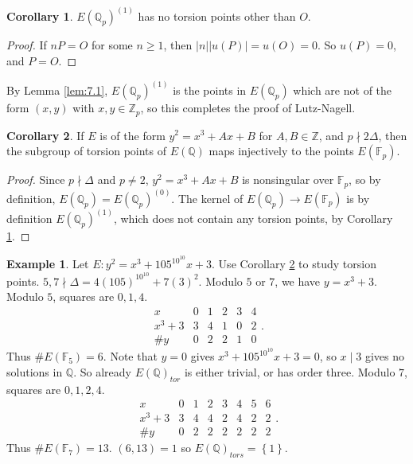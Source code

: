 \documentclass{article}
\newcommand{\F}{\mathbb{F}}
\newcommand{\Z}{\mathbb{Z}}
\newcommand{\Q}{\mathbb{Q}}
\newcommand{\rb}[1]{\left( #1 \right)}
\newcommand{\cb}[1]{\left\{ #1 \right\}}
\newcommand{\abs}[1]{\left\lvert #1 \right\rvert}
\theoremstyle{definition}\newtheorem{definition}{Definition}[section]
\theoremstyle{definition}\newtheorem{remark}[definition]{Remark}
\theoremstyle{definition}\newtheorem*{example}{Example}
\theoremstyle{definition}\newtheorem*{note}{Note}
\newtheorem{corollary}[definition]{Corollary}
\begin{document}
\begin{corollary}
\label{cor:7.7}
$ E\rb{\Q_p}^{\rb{1}} $ has no torsion points other than $ O $.
\end{corollary}

\begin{proof}
If $ nP = O $ for some $ n \ge 1 $, then $ \abs{n}\abs{u\rb{P}} = u\rb{O} = 0 $. So $ u\rb{P} = 0 $, and $ P = O $.
\end{proof}

By Lemma \ref{lem:7.1}, $ E\rb{\Q_p}^{\rb{1}} $ is the points in $ E\rb{\Q_p} $ which are not of the form $ \rb{x, y} $ with $ x, y \in \Z_p $, so this completes the proof of Lutz-Nagell.

\begin{corollary}
\label{cor:7.8}
If $ E $ is of the form $ y^2 = x^3 + Ax + B $ for $ A, B \in \Z $, and $ p \nmid 2\Delta $, then the subgroup of torsion points of $ E\rb{\Q} $ maps injectively to the points $ E\rb{\F_p} $.
\end{corollary}

\begin{proof}
Since $ p \nmid \Delta $ and $ p \ne 2 $, $ y^2 = x^3 + Ax + B $ is nonsingular over $ \F_p $, so by definition, $ E\rb{\Q_p} = E\rb{\Q_p}^{\rb{0}} $. The kernel of $ E\rb{\Q_p} \to E\rb{\F_p} $ is by definition $ E\rb{\Q_p}^{\rb{1}} $, which does not contain any torsion points, by Corollary \ref{cor:7.7}.
\end{proof}

\begin{example}
Let $ E : y^2 = x^3 + 105^{10^{10}}x + 3 $. Use Corollary \ref{cor:7.8} to study torsion points. $ 5, 7 \nmid \Delta = 4\rb{105}^{10^{10}} + 7\rb{3}^2 $. Modulo $ 5 $ or $ 7 $, we have $ y = x^3 + 3 $. Modulo $ 5 $, squares are $ 0, 1, 4 $.
$$
\begin{array}{c|ccccc}
x & 0 & 1 & 2 & 3 & 4 \\
\hline
x^3 + 3 & 3 & 4 & 1 & 0 & 2 \\
\#y & 0 & 2 & 2 & 1 & 0
\end{array}.
$$
Thus $ \#E\rb{\F_5} = 6 $. Note that $ y = 0 $ gives $ x^3 + 105^{10^{10}}x + 3 = 0 $, so $ x \mid 3 $ gives no solutions in $ \Q $. So already $ E\rb{\Q}_{tor} $ is either trivial, or has order three. Modulo $ 7 $, squares are $ 0, 1, 2, 4 $.
$$
\begin{array}{c|ccccccc}
x & 0 & 1 & 2 & 3 & 4 & 5 & 6 \\
\hline
x^3 + 3 & 3 & 4 & 4 & 2 & 4 & 2 & 2 \\
\#y & 0 & 2 & 2 & 2 & 2 & 2 & 2
\end{array}.
$$
Thus $ \#E\rb{\F_7} = 13 $. $ \rb{6, 13} = 1 $ so $ E\rb{\Q}_{tors} = \cb{1} $.
\end{example}
\end{document}

